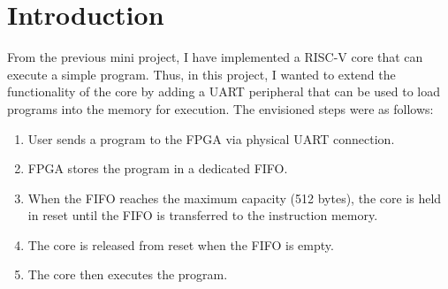 \section{Introduction}

From the previous mini project, I have implemented a RISC-V core that can execute a simple program. Thus, in this project, I wanted to extend the functionality of the core by adding a UART peripheral that can be used to load programs into the memory for execution. The envisioned steps were as follows:

\begin{enumerate}
    \item User sends a program to the FPGA via physical UART connection.
    \item FPGA stores the program in a dedicated FIFO.
    \item When the FIFO reaches the maximum capacity (512 bytes), the core is held in reset until the FIFO is transferred to the instruction memory.
    \item The core is released from reset when the FIFO is empty.
    \item The core then executes the program.
\end{enumerate}




